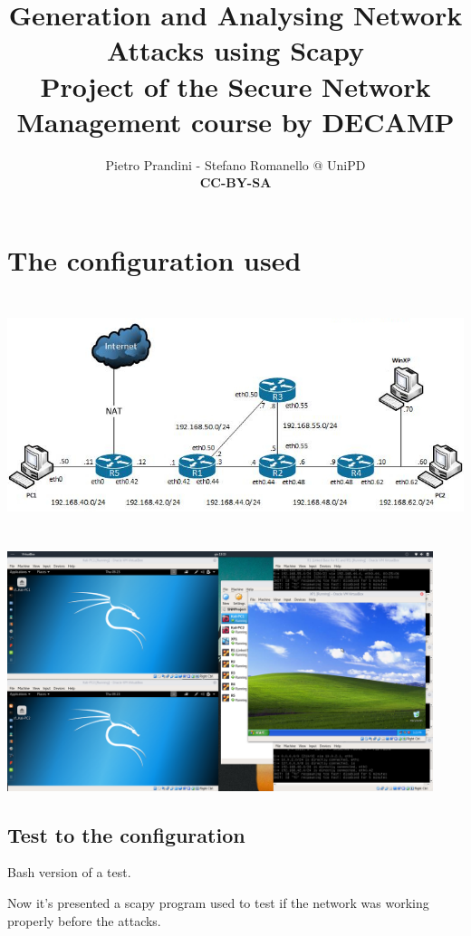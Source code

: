 \documentclass[10pt,a4paper]{article}
\author{Pietro Prandini - Stefano Romanello @ UniPD\\{\textbf{\tiny{CC-BY-SA}}}}
\title{Generation and Analysing Network Attacks using Scapy\\{\small{Project of the Secure Network Management course by DECAMP}}}
\begin{document}
\maketitle %

\section{The configuration used}
\begin{center}
\includegraphics[height=7cm]{img/NetworkConfiguration.jpg}\par
\includegraphics[height=7cm]{img/GlobalConfiguration.png}\par
\end{center}



\subsection{Test to the configuration}
Bash version of a test.\par

Now it's presented a scapy program used to test if the network was working properly before the attacks.\par

\end{document}
